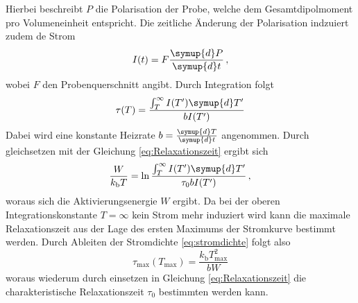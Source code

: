 Hierbei beschreibt $P$ die Polarisation der Probe, welche dem Gesamtdipolmoment pro Volumeneinheit entspricht.
Die zeitliche Änderung der Polarisation indzuiert zudem de Strom
\begin{equation}
    I(t) = F\frac{\symup{d}P}{\symup{d}t} \, ,
\end{equation}
wobei $F$ den Probenquerschnitt angibt.
Durch Integration folgt 
\begin{equation}
    \tau(T) = \frac{ \int_{T}^{\infty} I(T')\symup{d}T'}{bI(T')}
\end{equation}
Dabei wird eine konstante Heizrate $b = \frac{\symup{d}T}{\symup{d}t}$ angenommen.
Durch gleichsetzen mit der Gleichung \eqref{eq:Relaxationszeit} ergibt sich
\begin{equation}
    \frac{W}{k_\text{b}T} = \ln \frac{ \int_{T}^{\infty} I(T')\symup{d}T'}{\tau_0 b I(T')} \, ,
    \label{eq:int}
\end{equation}
woraus sich die Aktivierungsenergie $W$ ergibt.
Da bei der oberen Integrationskonstante $T=\infty$ kein Strom mehr induziert wird kann die maximale Relaxationszeit aus der Lage des ersten Maximums der Stromkurve bestimmt werden.
Durch Ableiten der Stromdichte \eqref{eq:stromdichte} folgt also
\begin{equation}
    \tau _\text{max}(T_\text{max}) = \frac{k_\text{b} T_\text{max} ^2}{bW}
\end{equation}
woraus wiederum durch einsetzen in Gleichung \eqref{eq:Relaxationszeit} die charakteristische Relaxationszeit $\tau_0$ bestimmten werden kann.


